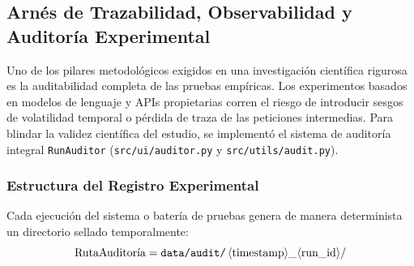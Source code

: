 \subsection{Arnés de Trazabilidad, Observabilidad y Auditoría Experimental}
\label{subsec:arnes_trazabilidad_auditoria}

Uno de los pilares metodológicos exigidos en una investigación científica rigurosa es la auditabilidad completa de las pruebas empíricas. Los experimentos basados en modelos de lenguaje y APIs propietarias corren el riesgo de introducir sesgos de volatilidad temporal o pérdida de traza de las peticiones intermedias. Para blindar la validez científica del estudio, se implementó el sistema de auditoría integral \texttt{RunAuditor} (\texttt{src/ui/auditor.py} y \texttt{src/utils/audit.py}).

\subsubsection{Estructura del Registro Experimental}
Cada ejecución del sistema o batería de pruebas genera de manera determinista un directorio sellado temporalmente:
\begin{equation}
    \text{RutaAuditoría} = \text{\texttt{data/audit/}} \, \langle\text{timestamp}\rangle\_\langle\text{run\_id}\rangle /
\end{equation}


